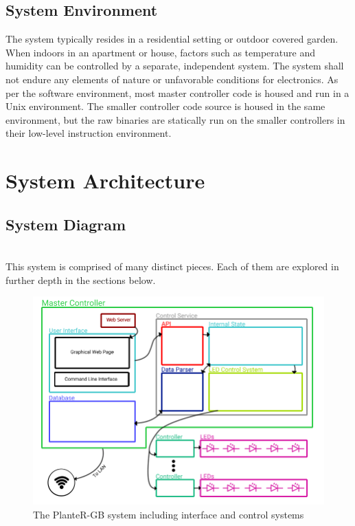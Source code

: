 		\subsection{System Environment}
		The system typically resides in a residential setting or outdoor covered garden. When indoors in an apartment or house, factors such as temperature and
		humidity can be controlled by a separate, independent system. The system shall not endure any elements of nature or unfavorable conditions
		for electronics. As per the software environment, most master controller code is housed and run in a Unix environment.
		The smaller controller code source is housed in the same environment, but the raw binaries are statically run on the smaller controllers in their low-level instruction environment.

	\section{System Architecture}
		\subsection{System Diagram}

		\noindent \\This system is comprised of many distinct pieces. Each of them are explored in further depth in the sections below.

		\begin{center}
			\begin{figure}[H]
				\includegraphics[width=\linewidth]{systemDiagrams/systemdiag.png}
				\caption{The PlanteR-GB system including interface and control systems}
				\label{fig:systemDiagram}
			\end{figure}
		\end{center}

